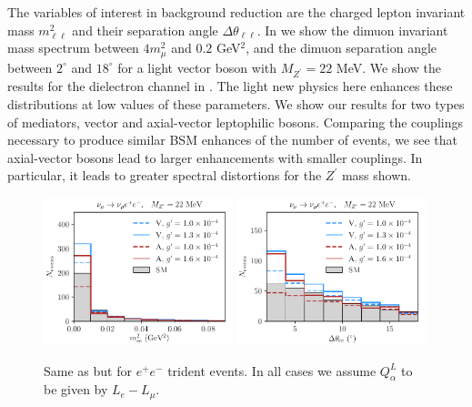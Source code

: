 The variables of interest in background reduction are the charged lepton invariant mass $m^2_{\ell \ell}$ and their separation angle $\Delta \theta_{\ell\ell}$. In  we show the dimuon invariant mass spectrum between $4 m_{\mu}^2$ and $0.2$ GeV$^2$, and the dimuon separation angle between $2^\circ$ and $18^\circ$ for a light vector boson with $M_{Z^\prime} = 22$ MeV. We show the results for the dielectron channel in . The light new physics here enhances these distributions at low values of these parameters. We show our results for two types of mediators, vector and axial-vector leptophilic bosons. Comparing the couplings necessary to produce similar BSM enhances 
of the number of events, we see that axial-vector bosons lead to larger enhancements with smaller couplings. In particular, it leads to greater spectral distortions for the $Z^\prime$ mass shown.
%
\begin{figure}[t]
%
\centering
%
\includegraphics[width=0.49\textwidth]{BSM_invmass_ee.pdf}
\includegraphics[width=0.49\textwidth]{BSM_sepangle_ee.pdf}
%
\caption[Dielectron distributions in the presence of a $Z^\prime$.]{Same as  but for $e^+e^-$ trident events. In all cases we assume $Q^L_{\alpha}$ to be given by $L_e - L_\mu$. \label{fig:ee_spectra}}
%
\end{figure}
%


